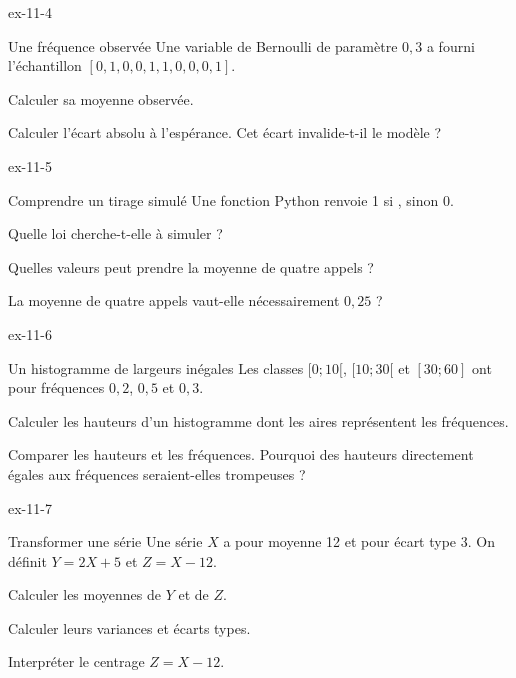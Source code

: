 \begin{blocLivre}{ex-11-4}
\begin{exercice}[1]{Une fréquence observée}
Une variable de Bernoulli de paramètre $0{,}3$ a fourni l’échantillon $[0,1,0,0,1,1,0,0,0,1]$.\begin{questions}
\item Calculer sa moyenne observée.
\item Calculer l’écart absolu à l’espérance. Cet écart invalide-t-il le modèle ?
\end{questions}
\end{exercice}
\end{blocLivre}
\begin{blocLivre}{ex-11-5}
\begin{exercice}[1]{Comprendre un tirage simulé}
Une fonction Python renvoie 1 si , sinon 0.\begin{questions}
\item Quelle loi cherche-t-elle à simuler ?
\item Quelles valeurs peut prendre la moyenne de quatre appels ?
\item La moyenne de quatre appels vaut-elle nécessairement $0{,}25$ ?
\end{questions}
\end{exercice}
\end{blocLivre}
\clearpage
{}
\begin{blocLivre}{ex-11-6}
\begin{exercice}[2]{Un histogramme de largeurs inégales}
Les classes $[0;10[$, $[10;30[$ et $[30;60]$ ont pour fréquences $0{,}2$, $0{,}5$ et $0{,}3$.\begin{questions}
\item Calculer les hauteurs d’un histogramme dont les aires représentent les fréquences.
\item Comparer les hauteurs et les fréquences. Pourquoi des hauteurs directement égales aux fréquences seraient-elles trompeuses ?
\end{questions}
\end{exercice}
\end{blocLivre}
\begin{blocLivre}{ex-11-7}
\begin{exercice}[2]{Transformer une série}
Une série $X$ a pour moyenne 12 et pour écart type 3. On définit $Y=2X+5$ et $Z=X-12$.\begin{questions}
\item Calculer les moyennes de $Y$ et de $Z$.
\item Calculer leurs variances et écarts types.
\item Interpréter le centrage $Z=X-12$.
\end{questions}
\end{exercice}
\end{blocLivre}
